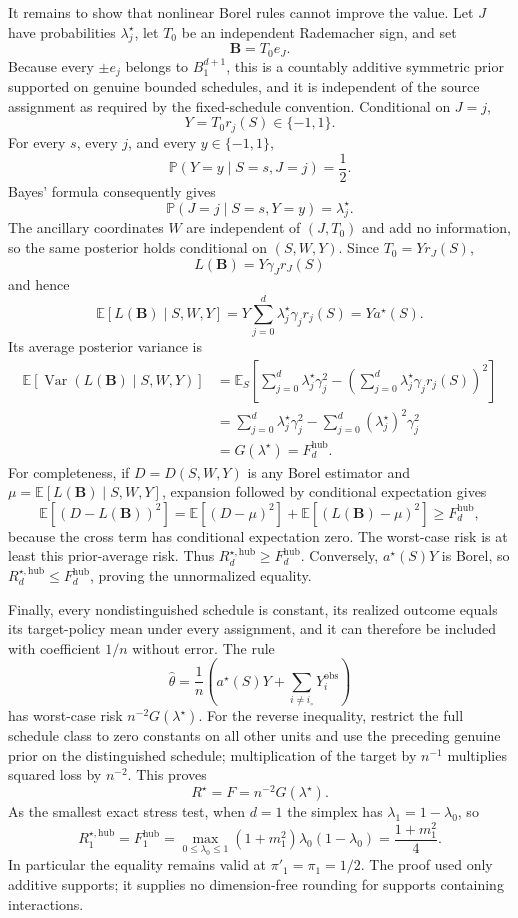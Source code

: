 It remains to show that nonlinear Borel rules cannot improve the value.  Let \(J\) have probabilities \(\lambda_j^{\star}\), let \(T_0\) be an independent Rademacher sign, and set
\[
 \mathbf B=T_0e_J.
\]
Because every \(\pm e_j\) belongs to \(B_1^{d+1}\), this is a countably additive symmetric prior supported on genuine bounded schedules, and it is independent of the source assignment as required by the fixed-schedule convention.  Conditional on \(J=j\),
\[
 Y=T_0r_j(S)\in\{-1,1\}.
\]
For every \(s\), every \(j\), and every \(y\in\{-1,1\}\),
\[
 \mathbb P(Y=y\mid S=s,J=j)=\frac12.
\]
Bayes' formula consequently gives
\[
 \mathbb P(J=j\mid S=s,Y=y)=\lambda_j^{\star}.
\]
The ancillary coordinates \(W\) are independent of \((J,T_0)\) and add no information, so the same posterior holds conditional on \((S,W,Y)\).  Since \(T_0=Yr_J(S)\),
\[
 L(\mathbf B)=Y\gamma_Jr_J(S)
\]
and hence
\[
 \mathbb E[L(\mathbf B)\mid S,W,Y]
 =Y\sum_{j=0}^d\lambda_j^{\star}\gamma_jr_j(S)
 =Ya^{\star}(S).
\]
Its average posterior variance is
\[
\begin{aligned}
 \mathbb E\!\left[\operatorname{Var}(L(\mathbf B)\mid S,W,Y)\right]
 &=\mathbb E_S\!\left[
 \sum_{j=0}^d\lambda_j^{\star}\gamma_j^2-
 \left(\sum_{j=0}^d\lambda_j^{\star}\gamma_jr_j(S)\right)^2
 \right]\\
 &=\sum_{j=0}^d\lambda_j^{\star}\gamma_j^2
   -\sum_{j=0}^d(\lambda_j^{\star})^2\gamma_j^2\\
 &=G(\lambda^{\star})=F_d^{\mathrm{hub}}.
\end{aligned}
\]
For completeness, if \(D=D(S,W,Y)\) is any Borel estimator and \(\mu=\mathbb E[L(\mathbf B)\mid S,W,Y]\), expansion followed by conditional expectation gives
\[
 \mathbb E[(D-L(\mathbf B))^2]
 =\mathbb E[(D-\mu)^2]
  +\mathbb E[(L(\mathbf B)-\mu)^2]
 \geq F_d^{\mathrm{hub}},
\]
because the cross term has conditional expectation zero.  The worst-case risk is at least this prior-average risk.  Thus \(R_d^{\star,\mathrm{hub}}\geq F_d^{\mathrm{hub}}\).  Conversely, \(a^{\star}(S)Y\) is Borel, so \(R_d^{\star,\mathrm{hub}}\leq F_d^{\mathrm{hub}}\), proving the unnormalized equality.

Finally, every nondistinguished schedule is constant, its realized outcome equals its target-policy mean under every assignment, and it can therefore be included with coefficient \(1/n\) without error.  The rule
\[
 \widehat\theta
 =\frac1n\left(a^{\star}(S)Y+
          \sum_{i\neq i_{\circ}}Y_i^{\mathrm{obs}}\right)
\]
has worst-case risk \(n^{-2}G(\lambda^{\star})\).  For the reverse inequality, restrict the full schedule class to zero constants on all other units and use the preceding genuine prior on the distinguished schedule; multiplication of the target by \(n^{-1}\) multiplies squared loss by \(n^{-2}\).  This proves
\[
 R^{\star}=F=n^{-2}G(\lambda^{\star}).
\]
As the smallest exact stress test, when \(d=1\) the simplex has \(\lambda_1=1-\lambda_0\), so
\[
 R_1^{\star,\mathrm{hub}}=F_1^{\mathrm{hub}}
 =\max_{0\leq\lambda_0\leq1}(1+m_1^2)\lambda_0(1-\lambda_0)
 =\frac{1+m_1^2}{4}.
\]
In particular the equality remains valid at \(\pi'_1=\pi_1=1/2\).  The proof used only additive supports; it supplies no dimension-free rounding for supports containing interactions.